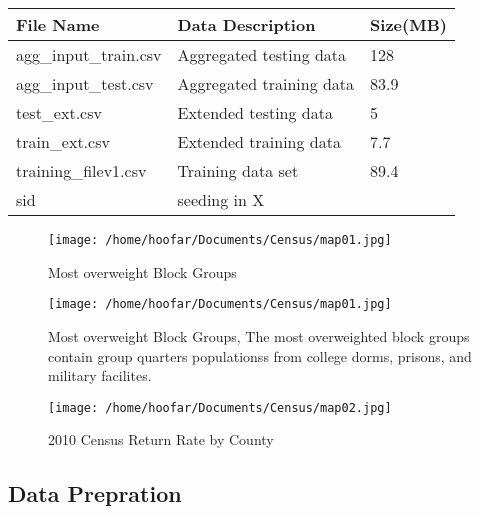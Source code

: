 \documentclass[journal]{/home/hoofar/LatexClasses/IEEEtran}
\begin{document}
\begin{table}[!h]
    \begin{tabular}{|l|l|l|}
        \hline
        File Name           & Data Description          & Size(MB) \\ \hline
        agg\_input\_train.csv & Aggregated testing data   & 128      \\ \hline
        agg\_input\_test.csv  & Aggregated training data  & 83.9     \\ \hline
        test\_ext.csv       & Extended testing data     & 5        \\ \hline
        train\_ext.csv       & Extended training data    & 7.7      \\ \hline
        training\_filev1.csv & Training data set         & 89.4     \\ \hline
        sid                 & seeding in X              & ~        \\ \hline
      
    \end{tabular}
\end{table}


\begin{figure}[!h]
\centering

\texttt{[image: /home/hoofar/Documents/Census/map01.jpg]}
    \caption{Most overweight Block Groups}
    \label{map overweighted}    

\end{figure}

\begin{figure}[!h]
\centering

\texttt{[image: /home/hoofar/Documents/Census/map01.jpg]}
    \caption{Most overweight Block Groups, The most overweighted block groups contain group
    quarters populationss from college dorms, prisons, and military facilites.}
    \label{map overweighted}    

\end{figure}

\begin{figure}[!h]
\centering

\texttt{[image: /home/hoofar/Documents/Census/map02.jpg]}
    \caption{2010 Census Return Rate by County}
    \label{map by county}    

\end{figure}


\subsection*{Data Prepration}
\end{document}
